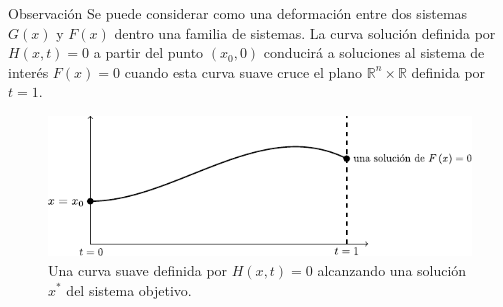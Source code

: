 \begin{frame}
	\begin{alertblock}{Observación}
		Se puede considerar como una deformación entre dos sistemas
		$G\left(x\right)$ y $F\left(x\right)$ dentro una familia de
		sistemas.
		La curva solución definida por
		\begin{math}
			H\left(x,t\right)=0
		\end{math}
		a partir del punto
		\begin{math}
			\left(x_{0},0\right)
		\end{math}
		conducirá a soluciones al sistema de interés
		\begin{math}
			F\left(x\right)=
			0
		\end{math}
		cuando esta curva suave cruce el plano
		\begin{math}
			\mathbb{R}^{n}\times\mathbb{R}
		\end{math}
		definida por $t=1$.
		\begin{figure}[ht!]
			\centering
			\includegraphics[width=0.65\paperwidth]{homotopy}
			\caption{
				Una curva suave definida por $H\left(x,t\right)=0$ alcanzando
				una solución $x^{\ast}$ del sistema objetivo.
			}
		\end{figure}
	\end{alertblock}


\end{frame}
